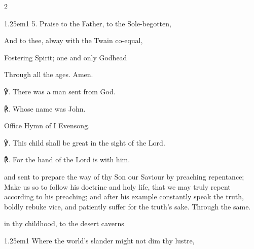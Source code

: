 \begin{paracol}{2}
\begin{hangparas}{1.25em}{1}
5. Praise to the Father, to the Sole-begotten,

And to thee, alway with the Twain co-equal,

Fostering Spirit; one and only Godhead

Through all the ages. Amen.\\	
\end{hangparas}

℣. There was a man sent from God.

℟. Whose name was John.


\secondEvensong
{}

\begin{rubric}
	Office Hymn of I Evensong.
\end{rubric}

℣. This child shall be great in the sight of the Lord.

℟. For the hand of the Lord is with him.


\collect
\label{JohnBaptistCollect}
 and sent to prepare the way of thy Son our Saviour by preaching repentance; Make us so to follow his doctrine and holy life, that we may truly repent according to his preaching; and after his example constantly speak the truth, boldly rebuke vice, and patiently suffer for the truth's sake. Through the same.

\switchcolumn

\mattins
{}

\mattinsInvitatoryHymn
{} in thy childhood, to the desert caverns


\begin{hangparas}{1.25em}{1}
Where the world's slander might not dim thy lustre,


\end{hangparas}
\end{paracol}
